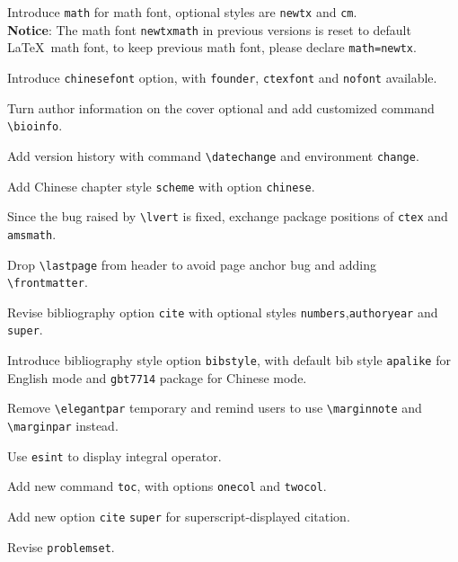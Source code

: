 \documentclass[11pt]{boyogalaelegantbook}
\begin{document}
\begin{change}
  \item Introduce \lstinline{math} for math font, optional styles are \lstinline{newtx} and \lstinline{cm}.\\
  \textbf{Notice}: The math font \lstinline{newtxmath} in previous versions is reset to default \LaTeX\ math font, to keep previous math font, please declare \lstinline{math=newtx}.
  \item Introduce \lstinline{chinesefont} option, with \lstinline{founder}, \lstinline{ctexfont} and \lstinline{nofont} available.
  \item Turn author information on the cover optional and add customized command \lstinline{\bioinfo}.
  \item Add version history with command \lstinline{\datechange} and environment \lstinline{change}.
  \item Add Chinese chapter style \lstinline{scheme} with option \lstinline{chinese}.
  \item Since the bug raised by \lstinline{\lvert} is fixed, exchange package positions of \lstinline{ctex} and \lstinline{amsmath}.
  \item Drop \lstinline{\lastpage} from header to avoid page anchor bug and adding \lstinline{\frontmatter}.
  \item Revise bibliography option \lstinline{cite} with optional styles \lstinline{numbers},\lstinline{authoryear} and \lstinline{super}.
  \item Introduce bibliography style option \lstinline{bibstyle}, with default bib style \lstinline{apalike} for English mode and \lstinline{gbt7714} package for Chinese mode.
\end{change}


\begin{change}
  \item Remove \lstinline{\elegantpar} temporary and remind users to use \lstinline{\marginnote} and \lstinline{\marginpar} instead.
  \item Use \lstinline{esint} to display integral operator.
  \item Add new command \lstinline{toc}, with options  \lstinline{onecol} and \lstinline{twocol}.
  \item Add new option \lstinline{cite} \lstinline{super} for superscript-displayed citation.
  \item Revise \lstinline{problemset}.
\end{change}
\end{document}
